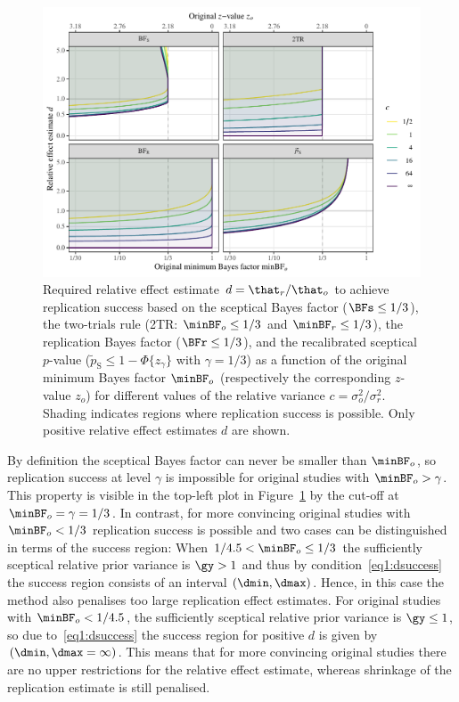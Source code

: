 \begin{figure}[!htb]
\begin{knitrout}
\color{fgcolor}
\includegraphics[width=\maxwidth]{images/paper1/plot-success-region-comparison-1}
\end{knitrout}
\caption{Required relative effect estimate $d = \that_{r}/\that_{o}$ to achieve
  replication success based on the sceptical Bayes factor
  ($\BFs \leq 1/3$), the two-trials rule (2TR:
  $\minBF_{o} \leq 1/3$ and $\minBF_{r} \leq 1/3$),
  the replication Bayes factor ($\BFr \leq 1/3$), and the
  recalibrated sceptical $p$-value
  ($\tilde{p}_{\mathrm{S}} \leq 1 - \Phi\{z_{\gamma}\}$ with
  $\gamma = 1/3$) as a function of the original minimum
  Bayes factor $\minBF_{o}$ (respectively the corresponding $z$-value $z_{o}$)
  for different values of the relative variance
  $c = \sigma^{2}_{o}/\sigma^{2}_{r}$. Shading indicates regions where
  replication success is possible. Only positive relative effect estimates $d$
  are shown.}
\label{fig1:dcomparison}
\end{figure}

By definition the sceptical Bayes factor can never be smaller than $\minBF_{o}$,
so replication success at level $\gamma$ is impossible for original studies with
$\minBF_{o} > \gamma$. This property is visible in the top-left plot in
Figure~\ref{fig1:dcomparison} by the cut-off at $\minBF_{o} = \gamma = 1/3$. In
contrast, for more convincing original studies with $\minBF_{o} < 1/3$
replication success is possible and two cases can be distinguished in terms of
the success region: When $1/4.5 < \minBF_{o} \leq 1/3$ the
sufficiently sceptical relative prior variance is $\gy > 1$ and thus by
condition~\eqref{eq1:dsuccess} the success region consists of an interval
$(\dmin, \dmax)$. Hence, in this case the method also penalises too large
replication effect estimates. For original studies with
$\minBF_{o} < 1/4.5$, the sufficiently sceptical relative prior
variance is $\gy \leq 1$, so due to~\eqref{eq1:dsuccess} the success region for
positive $d$ is given by $(\dmin, \dmax = \infty)$. This means that for more
convincing original studies there are no upper restrictions for the relative
effect estimate, whereas shrinkage of the replication estimate is still
penalised.

